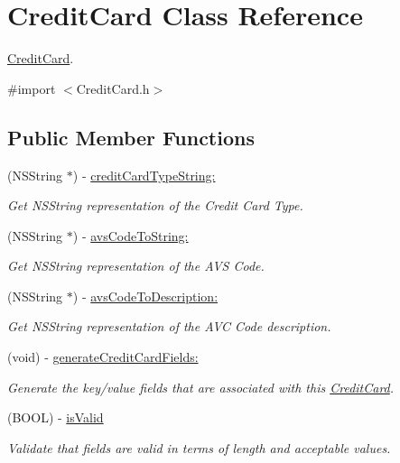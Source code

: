 \hypertarget{interface_credit_card}{
\section{CreditCard Class Reference}
\label{interface_credit_card}
}


\hyperlink{interface_credit_card}{CreditCard}.  




{\ttfamily \#import $<$CreditCard.h$>$}

\subsection*{Public Member Functions}
\begin{DoxyCompactItemize}
\item 
(NSString $\ast$) -\/ \hyperlink{interface_credit_card_a02130f1f00cd68fb813ff2c5a78853ab}{creditCardTypeString:}
\begin{DoxyCompactList}\small\item\em Get NSString representation of the Credit Card Type. \item\end{DoxyCompactList}\item 
(NSString $\ast$) -\/ \hyperlink{interface_credit_card_ab6cbd1d21cedb4fc982f46ff858fbb74}{avsCodeToString:}
\begin{DoxyCompactList}\small\item\em Get NSString representation of the AVS Code. \item\end{DoxyCompactList}\item 
(NSString $\ast$) -\/ \hyperlink{interface_credit_card_a38cec2721db46428b3ffcb07c5a105e0}{avsCodeToDescription:}
\begin{DoxyCompactList}\small\item\em Get NSString representation of the AVC Code description. \item\end{DoxyCompactList}\item 
(void) -\/ \hyperlink{interface_credit_card_a6c14ddd655215402e8232271f77a5ec6}{generateCreditCardFields:}
\begin{DoxyCompactList}\small\item\em Generate the key/value fields that are associated with this \hyperlink{interface_credit_card}{CreditCard}. \item\end{DoxyCompactList}\item 
(BOOL) -\/ \hyperlink{interface_credit_card_a9b2bbbda0eaf51af013aa1d4db4a36f5}{isValid}
\begin{DoxyCompactList}\small\item\em Validate that fields are valid in terms of length and acceptable values. \item\end{DoxyCompactList}\end{DoxyCompactItemize}
